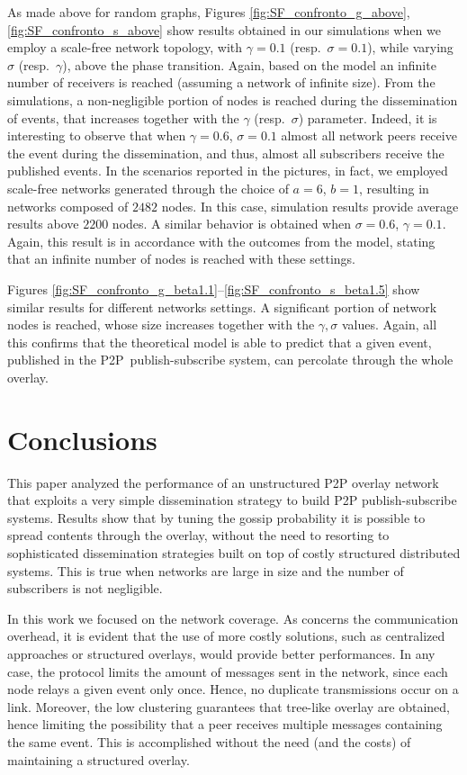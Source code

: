 \documentclass[10pt, conference, compsocconf]{IEEEtran}
\begin{document}
As made above for random graphs, Figures \ref{fig:SF_confronto_g_above}, \ref{fig:SF_confronto_s_above} show results obtained in our simulations when we employ a scale-free network topology, with $\gamma=0.1$ (resp.~$\sigma=0.1$), while varying $\sigma$ (resp.~$\gamma$), above the phase transition. Again, based on the model an infinite number of receivers is reached (assuming a network of infinite size). From the simulations, a non-negligible portion of nodes is reached during the dissemination of events, that increases together with the $\gamma$ (resp.~$\sigma$) parameter. 
Indeed, it is interesting to observe that when $\gamma = 0.6$, $\sigma = 0.1$ almost all network peers receive the event during the dissemination, and thus, almost all subscribers receive the published events. In the scenarios reported in the pictures, in fact, we employed scale-free networks generated through the choice of $a=6$, $b=1$, resulting in networks composed of $2482$ nodes. In this case, simulation results provide average results above $2200$ nodes.
A similar behavior is obtained when $\sigma = 0.6$, $\gamma = 0.1$.
Again, this result is in accordance with the outcomes from the model, stating that an infinite number of nodes is reached with these settings.

Figures \ref{fig:SF_confronto_g_beta1.1}--\ref{fig:SF_confronto_s_beta1.5} show similar results for different networks settings. A significant portion of network nodes is reached, whose size increases together with the $\gamma, \sigma$ values. Again, all this confirms that the theoretical model is able to predict that a given event, published in the \ac{P2P}~publish-subscribe system, can percolate through the whole overlay.

\section{Conclusions}\label{sec:conc}

This paper analyzed the performance of an unstructured P2P overlay network that exploits a very simple dissemination strategy to build \ac{P2P} publish-subscribe systems. 
Results show that by tuning the gossip probability it is possible to spread contents through the overlay, without the need to resorting to sophisticated dissemination strategies built on top of costly structured distributed systems.
This is true when networks are large in size and the number of subscribers is not negligible.

In this work we focused on the network coverage. As concerns the communication overhead,
it is evident that the use of more costly solutions, such as centralized approaches or structured overlays, would provide better performances. In any case, the protocol limits the amount of messages sent in the network, since each node relays a given event only once. Hence, no duplicate transmissions occur on a link. Moreover, the low clustering guarantees that tree-like overlay are obtained, hence limiting the possibility that a peer receives multiple messages containing the same event. This is accomplished without the need (and the costs) of maintaining a structured overlay.
\end{document}
